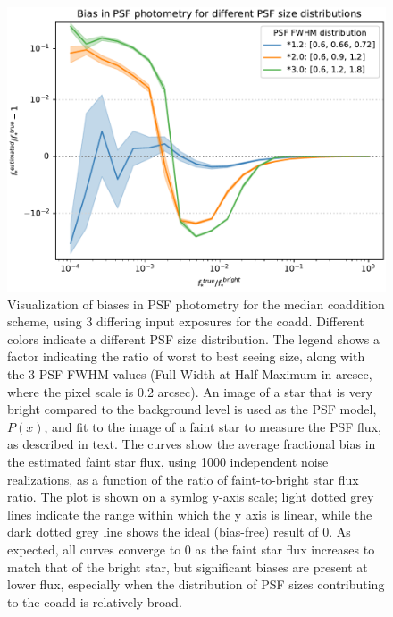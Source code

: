 \documentclass{openjournal}
\newcommand{\irresponse}[1]{{#1}}
\begin{document}
\begin{figure}
\begin{center}
    \includegraphics[width=5in]{figures/median_coadd_bias_dist.pdf}
    \caption{ Visualization of biases in PSF photometry for the median coaddition scheme, using 3 differing input exposures for the coadd.  Different colors indicate a different PSF size distribution. The legend shows a factor indicating the ratio of worst to best seeing size, along with the 3 PSF \irresponse{FWHM} values (\irresponse{Full-Width at Half-Maximum in arcsec, where the pixel scale is 0.2 arcsec}). An image of a star that is very bright compared to the background level is used as the PSF model, $P(x)$,  and fit to the image of a faint star to measure the PSF flux, as described in text. The curves show the average fractional bias in the estimated faint star flux, using 1000 independent noise realizations, as a function of the ratio of faint-to-bright star flux ratio.  The plot is shown on a symlog y-axis scale; light dotted grey lines indicate the range within which the y axis is linear, while the dark dotted grey line shows the ideal (bias-free) result of 0.  As expected, all curves converge to 0 as the faint star flux increases to match that of the bright star, but significant biases are present at lower flux, especially when the distribution of PSF sizes contributing to the coadd is relatively broad.}
    \label{fig:Median Coadd Bias}
\end{center}
\end{figure}
\end{document}
